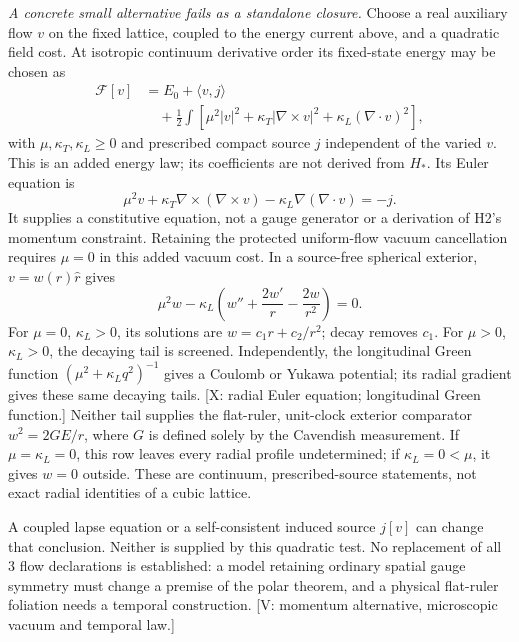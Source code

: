 \emph{A concrete small alternative fails as a standalone closure.}
Choose a real auxiliary flow $v$ on the fixed lattice, coupled to
the energy current above, and a quadratic field cost.
At isotropic continuum derivative order its fixed-state energy
may be chosen as
\[
 \begin{aligned}
 \mathcal F[v]&=E_0+\langle v,j\rangle\\
 &\quad+\tfrac12\int
 \left[\mu^2|v|^2+\kappa_T|\nabla\times v|^2
                 +\kappa_L(\nabla\cdot v)^2\right],
 \end{aligned}
\]
with $\mu,\kappa_T,\kappa_L\ge0$ and prescribed compact source
$j$ independent of the varied $v$.
This is an added energy law; its coefficients are not derived
from $H_*$.
Its Euler equation is
\[
 \mu^2v+\kappa_T\nabla\times(\nabla\times v)
       -\kappa_L\nabla(\nabla\cdot v)=-j .
\]
It supplies a constitutive equation, not a gauge generator or a
derivation of H2's momentum constraint.
Retaining the protected uniform-flow vacuum cancellation requires
$\mu=0$ in this added vacuum cost.
In a source-free spherical exterior, $v=w(r)\hat r$ gives
\[
 \mu^2w-\kappa_L\left(w''+\frac{2w'}r-\frac{2w}{r^2}\right)=0 .
\]
For $\mu=0$, $\kappa_L>0$, its solutions are $w=c_1r+c_2/r^2$;
decay removes $c_1$.  For $\mu>0$, $\kappa_L>0$, the decaying
tail is screened.
Independently, the longitudinal Green function
$(\mu^2+\kappa_Lq^2)^{-1}$ gives a Coulomb or Yukawa potential;
its radial gradient gives these same decaying tails.
[X: radial Euler equation; longitudinal Green function.]
Neither tail supplies the flat-ruler, unit-clock exterior
comparator $w^2=2GE/r$, where $G$ is defined solely by the
Cavendish measurement.
If $\mu=\kappa_L=0$, this row leaves every radial profile
undetermined; if $\kappa_L=0<\mu$, it gives $w=0$ outside.
These are continuum, prescribed-source statements, not exact
radial identities of a cubic lattice.

A coupled lapse equation or a self-consistent induced source
$j[v]$ can change that conclusion.  Neither is supplied by this
quadratic test.  No replacement of all 3 flow declarations is
established: a model retaining ordinary spatial gauge symmetry
must change a premise of the polar theorem, and a physical
flat-ruler foliation needs a temporal construction.
[V: momentum alternative, microscopic vacuum and temporal law.]

